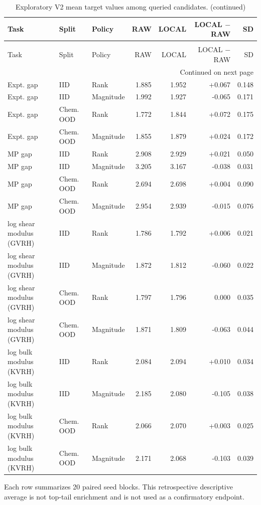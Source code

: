 \setlength{\tabcolsep}{3pt}
\footnotesize
\begin{longtable}{@{}lllrrrr@{}}
\caption{Exploratory V2 mean target values among queried candidates.}\label{tab:v2_query_quality}\\
\toprule
Task & Split & Policy & RAW & LOCAL & LOCAL $-$ RAW & SD \\
\midrule
\endfirsthead
\caption[]{Exploratory V2 mean target values among queried candidates. (continued)}\\
\toprule
Task & Split & Policy & RAW & LOCAL & LOCAL $-$ RAW & SD \\
\midrule
\endhead
\midrule\multicolumn{7}{r}{Continued on next page}\\
\endfoot
\bottomrule
\endlastfoot
Expt. gap & IID & Rank & 1.885 & 1.952 & +0.067 & 0.148 \\
Expt. gap & IID & Magnitude & 1.992 & 1.927 & -0.065 & 0.171 \\
Expt. gap & Chem. OOD & Rank & 1.772 & 1.844 & +0.072 & 0.175 \\
Expt. gap & Chem. OOD & Magnitude & 1.855 & 1.879 & +0.024 & 0.172 \\
MP gap & IID & Rank & 2.908 & 2.929 & +0.021 & 0.050 \\
MP gap & IID & Magnitude & 3.205 & 3.167 & -0.038 & 0.031 \\
MP gap & Chem. OOD & Rank & 2.694 & 2.698 & +0.004 & 0.090 \\
MP gap & Chem. OOD & Magnitude & 2.954 & 2.939 & -0.015 & 0.076 \\
log shear modulus (GVRH) & IID & Rank & 1.786 & 1.792 & +0.006 & 0.021 \\
log shear modulus (GVRH) & IID & Magnitude & 1.872 & 1.812 & -0.060 & 0.022 \\
log shear modulus (GVRH) & Chem. OOD & Rank & 1.797 & 1.796 & 0.000 & 0.035 \\
log shear modulus (GVRH) & Chem. OOD & Magnitude & 1.871 & 1.809 & -0.063 & 0.044 \\
log bulk modulus (KVRH) & IID & Rank & 2.084 & 2.094 & +0.010 & 0.034 \\
log bulk modulus (KVRH) & IID & Magnitude & 2.185 & 2.080 & -0.105 & 0.038 \\
log bulk modulus (KVRH) & Chem. OOD & Rank & 2.066 & 2.070 & +0.003 & 0.025 \\
log bulk modulus (KVRH) & Chem. OOD & Magnitude & 2.171 & 2.068 & -0.103 & 0.039 \\
\end{longtable}
\noindent\footnotesize Each row summarizes 20 paired seed blocks. This retrospective descriptive average is not top-tail enrichment and is not used as a confirmatory endpoint.
